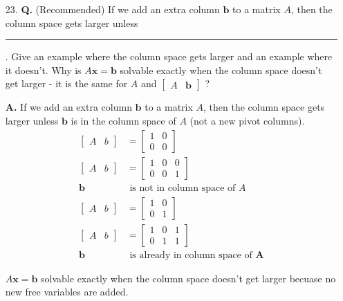 \documentclass[main.tex]{subfiles}
\begin{document}
\begin{enumerate}
    \item [23.] \textbf{Q.} (Recommended) If we add an extra column $\bm{b}$ to a matrix $A$, then the column space gets larger unless \rule{1cm}{0.15mm}. Give an example where the column space gets larger and an example where it doesn't. Why is $A \bm{x}=\bm{b}$ solvable exactly when the column space doesn't get larger - it is the same for $A$ and $\left[\begin{array}{ll}A & \bm{b}\end{array}\right]$ ? 
    
    \textbf{A.} If we add an extra column $\bm{b}$ to a matrix $A$, then the column space gets larger unless $\bm{b}$ is in the column space of $A$ (not a new pivot columns).
    $$
    \begin{aligned}
    \left[\begin{array}{ll}
    A & b
    \end{array}\right] &=\left[\begin{array}{ll}
    1 & 0 \\
    0 & 0
    \end{array}\right]\\
    \left[\begin{array}{ll}
    A & b
    \end{array}\right] &=\left[\begin{array}{lll}
    1 & 0 & 0 \\
    0 & 0 & 1
    \end{array}\right]\\
    \bm{b} &\text { is not in column space of } A\\
    \left[\begin{array}{ll}
    A & b
    \end{array}\right]&=\left[\begin{array}{ll}
    1 & 0 \\
    0 & 1
    \end{array}\right]\\
    \left[\begin{array}{ll}
    A & b
    \end{array}\right]&=\left[\begin{array}{lll}
    1 & 0 & 1 \\
    0 & 1 & 1
    \end{array}\right]\\
    \bm{b} &\text { is already in column space of } \bm{A}
    \end{aligned}
    $$
    
    $A \bm{x}=\bm{b}$ solvable exactly when the column space doesn't get larger becuase no new free variables are added.
    

\end{enumerate}
\end{document}

